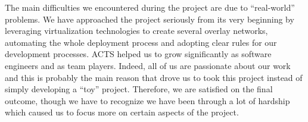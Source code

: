 The main difficulties we encountered during the project are due to
``real-world'' problems. We have approached the project seriously
from its very beginning by leveraging virtualization technologies to
create several overlay networks, automating the whole deployment
process and adopting clear rules for our development processes.
ACTS helped us to grow significantly as software engineers and
as team players. Indeed, all
of us are passionate about our work and this is probably the main
reason that drove us to took this project
instead of simply developing a ``toy'' project.
Therefore, we are satisfied on the final outcome, though we
have to recognize we have been through a lot of hardship
which caused us to
focus more on certain aspects of the project.







